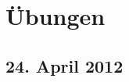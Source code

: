 \documentclass[a4paper,12pt]{report}
\makeatletter
\theoremstyle{break}
\theoremstyle{nonumberbreak}
\theoremstyle{nonumberplain}
\def\@seccntformat#1{\@ifundefined{#1@cntformat}%
{\csname the#1\endcsname\quad}%
{\csname #1@cntformat\endcsname}%
}
\def\section@cntformat{\S\@arabic\c@section\quad}
\makeatother
\begin{document}
\def\indexspace{\par\medskip}



\chapter{\"Ubungen}

\makeatletter
\def\@seccntformat#1{\@ifundefined{#1@cntformat}%
{\csname the#1\endcsname\quad}%
{\csname #1@cntformat\endcsname}%
}
\def\section@cntformat{\"Ubung \@arabic\c@section \mbox{ vom }}

\setcounter{section}{-1}

\section{24. April 2012}
\setcounter{Aufg}{0} %
\end{document}
